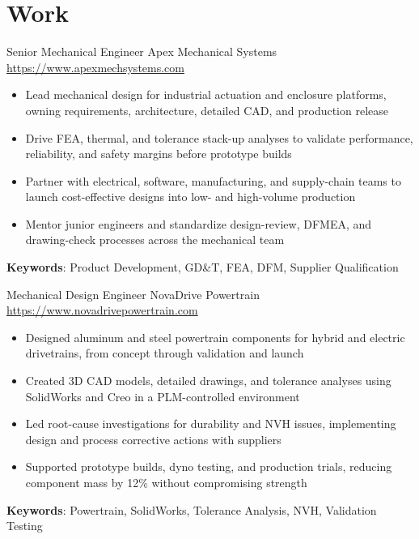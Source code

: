 \documentclass[a4paper, serif, 10pt]{moderncv}
\begin{document}
\section{Work}

        {Senior Mechanical Engineer}
        {Apex Mechanical Systems}
        {\url{https://www.apexmechsystems.com}}
        {}
        {\begin{itemize}
\item Lead mechanical design for industrial actuation and enclosure platforms, owning requirements, architecture, detailed CAD, and production release
\item Drive FEA, thermal, and tolerance stack-up analyses to validate performance, reliability, and safety margins before prototype builds
\item Partner with electrical, software, manufacturing, and supply-chain teams to launch cost-effective designs into low- and high-volume production
\item Mentor junior engineers and standardize design-review, DFMEA, and drawing-check processes across the mechanical team
\end{itemize}
\textbf{Keywords}: Product Development, GD\&T, FEA, DFM, Supplier Qualification}

        {Mechanical Design Engineer}
        {NovaDrive Powertrain}
        {\url{https://www.novadrivepowertrain.com}}
        {}
        {\begin{itemize}
\item Designed aluminum and steel powertrain components for hybrid and electric drivetrains, from concept through validation and launch
\item Created 3D CAD models, detailed drawings, and tolerance analyses using SolidWorks and Creo in a PLM-controlled environment
\item Led root-cause investigations for durability and NVH issues, implementing design and process corrective actions with suppliers
\item Supported prototype builds, dyno testing, and production trials, reducing component mass by 12\% without compromising strength
\end{itemize}
\textbf{Keywords}: Powertrain, SolidWorks, Tolerance Analysis, NVH, Validation Testing}
\end{document}
